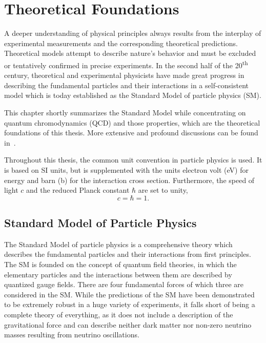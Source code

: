 
\chapter{Theoretical Foundations}
\label{sec:theoretical_foundations}

A deeper understanding of physical principles always results from the interplay
of experimental measurements and the corresponding theoretical predictions.
Theoretical models attempt to describe nature's behavior and must be excluded or
tentatively confirmed in precise experiments. In the second half of the 20\textsuperscript{th}
century, theoretical and experimental physicists have made great progress in
describing the fundamental particles and their interactions in a self-consistent
model which is today established as the Standard Model of particle physics (SM).

This chapter shortly summarizes the Standard Model while concentrating on
quantum chromodynamics (QCD) and those properties, which are the theoretical
foundations of this thesis. More extensive and profound discussions can be found
in~\cite{Peskin:1995ev,Agashe:2014kda,Ellis:1991qj,Buckley:2011ms}.

Throughout this thesis, the common unit convention in particle physics is used.
It is based on SI units, but is supplemented with the units electron volt
(\si{\electronvolt}) for energy and barn (\si{\barn}) for the interaction cross
section. Furthermore, the speed of light $c$ and the reduced Planck constant
$\hbar$ are set to unity,
%
\begin{equation*}
    c = \hbar = 1.
\end{equation*}

\section{Standard Model of Particle Physics}

The Standard Model of particle physics is a comprehensive theory  which
describes the fundamental particles and their interactions from first
principles. The SM is founded on the concept of quantum field theories, in which
the elementary particles and the interactions between them are described by
quantized gauge fields. There are four fundamental forces of which three are
considered in the SM. While the predictions of the SM have been demonstrated to
be extremely robust in a huge variety of experiments, it falls short of being a
complete theory of everything, as it does not include a description of the
gravitational force and can describe neither dark matter nor non-zero neutrino
masses resulting from neutrino oscillations.

